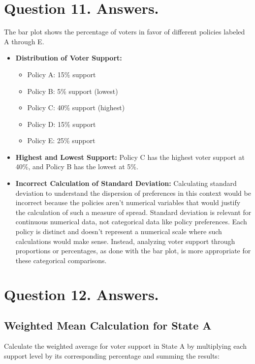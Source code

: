 \documentclass{article}
\begin{document}
\section*{Question 11. Answers.}

The bar plot shows the percentage of voters in favor of different policies labeled A through E.

\begin{itemize}
    \item \textbf{Distribution of Voter Support:}
    \begin{itemize}
        \item Policy A: 15\% support
        \item Policy B: 5\% support (lowest)
        \item Policy C: 40\% support (highest)
        \item Policy D: 15\% support
        \item Policy E: 25\% support
    \end{itemize}
    \item \textbf{Highest and Lowest Support:} Policy C has the highest voter support at 40\%, and Policy B has the lowest at 5\%.
    \item \textbf{Incorrect Calculation of Standard Deviation:} Calculating standard deviation to understand the dispersion of preferences in this context would be incorrect because the policies aren't numerical variables that would justify the calculation of such a measure of spread. Standard deviation is relevant for continuous numerical data, not categorical data like policy preferences. Each policy is distinct and doesn't represent a numerical scale where such calculations would make sense. Instead, analyzing voter support through proportions or percentages, as done with the bar plot, is more appropriate for these categorical comparisons.
\end{itemize}

\section*{Question 12. Answers.}

\subsection*{Weighted Mean Calculation for State A}

Calculate the weighted average for voter support in State A by multiplying each support level by its corresponding percentage and summing the results:
\end{document}
